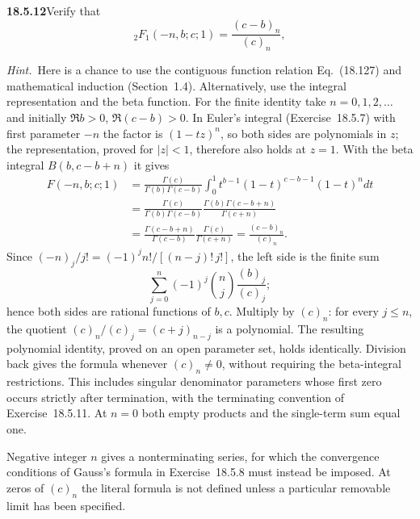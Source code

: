 \par\bigskip
\noindent\textbf{18.5.12}\quad Verify that
\[
{}_{2}F_{1}(-n,b;c;1)=\frac{(c-b)_{n}}{(c)_{n}},
\]
\par\emph{Hint.}~Here is a chance to use the contiguous function
relation Eq.~(18.127) and mathematical induction (Section~1.4).
Alternatively, use the integral representation and the beta
function.
\solution
For the finite identity take $n=0,1,2,\ldots$ and initially
$\Re b>0$, $\Re(c-b)>0$.  In Euler's integral (Exercise~18.5.7)
with first parameter $-n$ the factor is $(1-tz)^n$, so both sides
are polynomials in $z$; the representation, proved for $|z|<1$,
therefore also holds at $z=1$.  With the beta integral
$B(b,c-b+n)$ it gives
\begin{align*}
F(-n,b;c;1)
 &=\frac{\Gamma(c)}{\Gamma(b)\Gamma(c-b)}
   \int_0^1t^{b-1}(1-t)^{c-b-1}(1-t)^n dt\\
 &=\frac{\Gamma(c)}{\Gamma(b)\Gamma(c-b)}
   \frac{\Gamma(b)\Gamma(c-b+n)}{\Gamma(c+n)}\\
 &=\frac{\Gamma(c-b+n)}{\Gamma(c-b)}
   \frac{\Gamma(c)}{\Gamma(c+n)}
 =\boxed{\frac{(c-b)_n}{(c)_n}}.
\end{align*}
Since $(-n)_j/j!=(-1)^jn!/[(n-j)!\,j!]$, the left side is the
finite sum
\[
\sum_{j=0}^n(-1)^j\binom nj\frac{(b)_j}{(c)_j};
\]
hence both sides are rational functions of $b,c$.  Multiply by $(c)_n$:
for every $j\le n$, the quotient $(c)_n/(c)_j=(c+j)_{n-j}$
is a polynomial.  The resulting polynomial identity, proved on
an open parameter set, holds identically.  Division back gives
the formula whenever $(c)_n\ne0$, without requiring the
beta-integral restrictions.  This includes singular denominator
parameters whose first zero occurs strictly after termination,
with the terminating convention of Exercise~18.5.11.
At $n=0$ both empty products and the single-term sum equal one.

  Negative integer $n$ gives a
nonterminating series, for which the convergence conditions of
Gauss's formula in Exercise~18.5.8 must instead be imposed.
At zeros of $(c)_n$ the literal formula is not defined unless a
particular removable limit has been specified.

